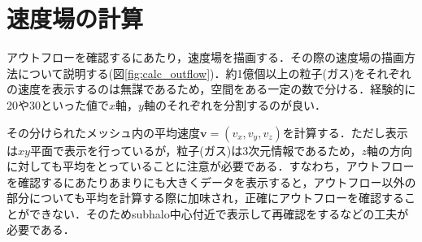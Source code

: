 \section{速度場の計算}

アウトフローを確認するにあたり，速度場を描画する．その際の速度場の描画方法について説明する(図\ref{fig:calc_outflow})．約1億個以上の粒子(ガス)をそれぞれの速度を表示するのは無謀であるため，空間をある一定の数で分ける．経験的に20や30といった値で$x$軸，$y$軸のそれぞれを分割するのが良い．

その分けられたメッシュ内の平均速度$\bm{v}=(v_x,v_y,v_z)$を計算する．ただし表示は$xy$平面で表示を行っているが，粒子(ガス)は3次元情報であるため，$z$軸の方向に対しても平均をとっていることに注意が必要である．すなわち，アウトフローを確認するにあたりあまりにも大きくデータを表示すると，アウトフロー以外の部分についても平均を計算する際に加味され，正確にアウトフローを確認することができない．そのためsubhalo中心付近で表示して再確認をするなどの工夫が必要である．
